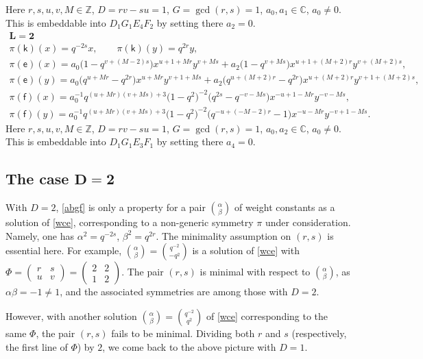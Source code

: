 \documentclass[10pt,a4paper]{amsart}
\numberwithin{equation}{section}
\begin{document}
Here $r,s,u,v,M\in\mathbb{Z}$, $D=rv-su=1$, $G=\operatorname{gcd}(r,s)=1$, $a_0,a_1\in\mathbb{C}$, $a_0\ne 0$. This is embeddable into $D_1G_1E_4F_2$ by setting there $a_2=0$.
\begin{gather*}
 \mathbf{L}=\mathbf{2}\\
\pi(\mathsf{k})(x)= q^{-2s}x ,\qquad\pi(\mathsf{k})(y)=q^{2r}y ,\\
\pi(\mathsf{e})(x)= a_0\big(1-q^{v+(M-2)s}\big)x^{u+1+Mr}y^{v+Ms}+ a_2\big(1-q^{v+Ms}\big)x^{u+1+(M+2)r}y^{v+(M+2)s} ,\\
\pi(\mathsf{e})(y)= a_0\big(q^{u+Mr}-q^{2r}\big)x^{u+Mr}y^{v+1+Ms}+ a_2\big(q^{u+(M+2)r}-q^{2r}\big)x^{u+(M+2)r}y^{v+1+(M+2)s} ,\\
\pi(\mathsf{f})(x)= a_0^{-1}q^{(u+Mr)(v+Ms)+3}\big(1-q^2\big)^{-2}\big(q^{2s}-q^{-v-Ms}\big)x^{-u+1-Mr}y^{-v-Ms} ,\\
\pi(\mathsf{f})(y)= a_0^{-1}q^{(u+Mr)(v+Ms)+3}\big(1-q^2\big)^{-2}\big(q^{-u+(-M-2)r}-1\big)x^{-u-Mr}y^{-v+1-Ms} .
\end{gather*}
Here $r,s,u,v,M\in\mathbb{Z}$, $D=rv-su=1$, $G=\operatorname{gcd}(r,s)=1$, $a_0,a_2\in\mathbb{C}$, $a_0\ne 0$. This is embeddable into $D_1G_1E_3F_1$ by setting there $a_4=0$.

\subsection[The case $D=2$]{The case $\boldsymbol{D=2}$}

With $D=2$, \eqref{abgf} is only a property for a pair $\binom{\alpha}{\beta}$ of weight constants as a solution of \eqref{wce}, corresponding to a non-generic symmetry $\pi$ under consideration. Namely, one has $\alpha^2=q^{-2s}$, $\beta^2=q^{2r}$. The minimality assumption on $(r,s)$ is essential here. For example, $\binom{\alpha}{\beta}=\binom{q^{-2}}{-q^2}$ is a solution of \eqref{wce} with $\Phi=\left(\begin{smallmatrix}r & s\\ u & v\end{smallmatrix}\right)=\left(\begin{smallmatrix}2 & 2\\ 1 & 2\end{smallmatrix}\right)$. The pair $(r,s)$ is minimal with respect to $\binom{\alpha}{\beta}$, as $\alpha\beta=-1\ne 1$, and the associated symmetries are among those with $D=2$.

However, with another solution $\binom{\alpha}{\beta}=\binom{q^{-2}}{q^2}$ of \eqref{wce} corresponding to the same $\Phi$, the pair $(r,s)$ fails to be minimal. Dividing both $r$ and $s$ (respectively, the first line of $\Phi$) by $2$, we come back to the above picture with $D=1$.
\end{document}
